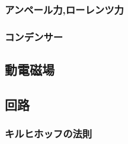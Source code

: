 \documentclass[dvipdfmx,uplatex]{jsarticle}
\begin{document}
\subsubsection{アンペール力,ローレンツ力}

\subsubsection{コンデンサー}

\subsection{動電磁場}

\subsection{回路}

\subsubsection{キルヒホッフの法則}
\end{document}
